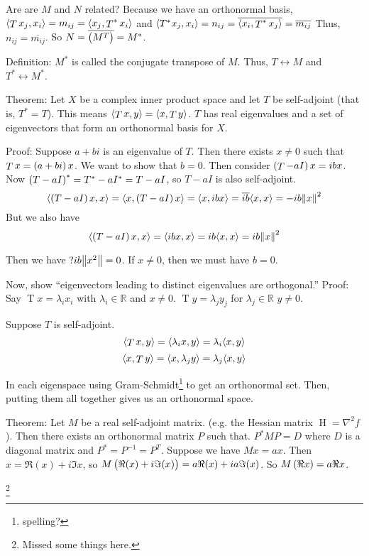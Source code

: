 \documentclass{article}
\DeclarePairedDelimiter\ip{\langle }{\rangle}
\begin{document}
Are are \(M\) and \(N\) related?
Because we have an orthonormal basis, \(\ip{\mathop T x_j, x_i} = m_{ij} = \ip{x_j, \mathop T^* x_i}\) and \(\ip{T^* x_j, x_i} = n_{ij}  = \overline{\ip{x_i, \mathop T^* x_j}} = \overline{m_{ij}}\)
Thus, \(n_{ij} = \overline{m_{ij}}\).
So \(N = \overline{\del{M^T}} = M^*\).

Definition: \(M^*\) is called the conjugate transpose of \(M\).
Thus, \(T \leftrightarrow M\) and \(T^* \leftrightarrow M^*\).

Theorem: Let \(X\) be a complex inner product space and let \(T\) be self-adjoint (that is, \(T^* = T\)).
This means \(\ip{\mathop T x, y} = \ip{x, \mathop T y}\).
\(T\) has real eigenvalues and a set of eigenvectors that form an orthonormal basis for \(X\).

Proof: Suppose \(a + bi\) is an eigenvalue of \(T\).
Then there exists \(x \neq 0\) such that \(\mathop T x = \del{a + bi}x\).
We want to show that \(b = 0\).
Then consider \(\del{\mathop T - aI}x = ibx\).
Now \(\del{T - aI}^* = T^* - aI^* = T - aI\), so \(T - aI\) is also self-adjoint.
\[\ip{\del{T - aI}x, x} = \ip{x, \del{T - aI}x} = \ip{x, ibx} = \overline{ib}\ip{x, x} = -ib\norm{x}^2\]
But we also have
\[\ip{\del{T - aI}x, x} = \ip{ibx, x} = ib\ip{x, x} = ib\norm{x}^2\]

Then we have \(?ib\norm{x^2} = 0\).
If \(x\neq 0\), then we must have \(b = 0\).

Now, show ``eigenvectors leading to distinct eigenvalues are orthogonal.''
Proof: Say \(\mathop T x = \lambda_i x_i\) with \(\lambda_i \in \mathbb{R}\) and \(x \neq 0\).
\(\mathop T y = \lambda_j y_j\) for \(\lambda_j \in \mathbb{R}\) \(y \neq 0\).

Suppose \(T\) is self-adjoint.
\[\ip{\mathop T x, y} = \ip{\lambda_i x, y} = \lambda_i \ip{x, y}\]
\[\ip{x, \mathop T y} = \ip{ x, \lambda_jy} = \lambda_j \ip{x, y}\]

In each eigenspace using Gram-Schmidt\footnote{spelling?} to get an orthonormal set.
Then, putting them all together gives us an orthonormal space.

Theorem: Let \(M\) be a real self-adjoint matrix. (e.g. the Hessian matrix \(\mathop{\mathrm H} = \nabla^2 f\)).
Then there exists an orthonormal matrix \(P\) such that.
\(P^*MP = D\) where \(D\) is a diagonal matrix and \(P^* = P^{-1} = P^T\).
Suppose we have \(Mx = ax\).
Then \(x = \Re(x) + i \Im{x}\), so \(M\del{\Re(x) + i\Im(x)} = a\Re(x) + ia\Im(x)\).
So \(M\del{\Re{x}} = a\Re{x}\).

\footnote{Missed some things here.}
\end{document}
